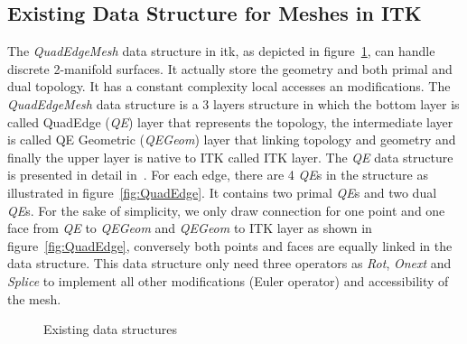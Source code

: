 \documentclass{InsightArticle}
\begin{document}
\subsection{Existing Data Structure for Meshes in ITK}
The \emph{QuadEdgeMesh} data structure in itk, as depicted in figure~\ref{fig:QuadEdgeMeshStructure}, can handle discrete 2-manifold surfaces. It actually store the geometry and both primal and dual topology. It has a constant complexity local accesses an modifications. The \emph{QuadEdgeMesh} data structure is a 3 layers structure in which the bottom layer is called QuadEdge (\emph{QE}) layer that represents the topology, the intermediate layer is called QE Geometric (\emph{QEGeom}) layer that linking topology and geometry and finally the upper layer is native to ITK called ITK layer. The \emph{QE} data structure is presented in detail in~\cite{Gouaillard2006}. For each edge, there are 4 \emph{QE}s in the structure as illustrated in figure~\ref{fig:QuadEdge}. It contains two primal \emph{QE}s and two dual \emph{QE}s. For the sake of simplicity, we only draw connection for one point and one face from \emph{QE} to \emph{QEGeom} and \emph{QEGeom} to ITK layer as shown in figure~\ref{fig:QuadEdge}, conversely both points and faces are equally linked in the data structure. This data structure only need three operators as \emph{Rot}, \emph{Onext} and \emph{Splice} to implement all other modifications (Euler operator) and accessibility of the mesh. 
\begin{figure}
	\centering
	\caption{Existing data structures}
	\label{fig:QuadEdgeMeshStructure}
\end{figure}
\end{document}
